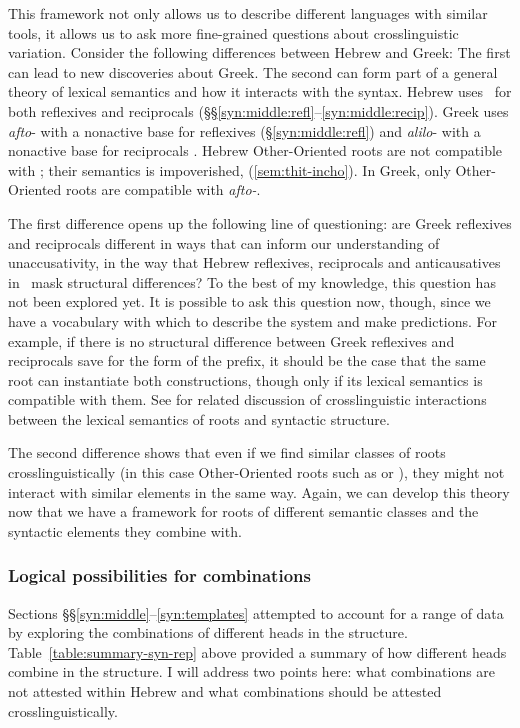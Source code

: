 This framework not only allows us to describe different languages with similar tools, it allows us to ask more fine-grained questions about crosslinguistic variation. Consider the following differences between Hebrew and Greek: The first can lead to new discoveries about Greek. The second can form part of a general theory of lexical semantics and how it interacts with the syntax.
\pex
	\a Hebrew uses \thit~for both reflexives and reciprocals (\S\S\ref{syn:middle:refl}--\ref{syn:middle:recip}). Greek uses \emph{afto}- with a nonactive base for reflexives (\S\ref{syn:middle:refl}) and \emph{alilo}- with a nonactive base for reciprocals \citep{alexiadouafto}.
	\a Hebrew Other-Oriented roots are not compatible with \va; their semantics is impoverished, (\ref{sem:thit-incho}). In Greek, only Other-Oriented roots are compatible with \emph{afto-}.
\xe

The first difference opens up the following line of questioning: are Greek reflexives and reciprocals different in ways that can inform our understanding of unaccusativity, in the way that Hebrew reflexives, reciprocals and anticausatives in \thit~mask structural differences? To the best of my knowledge, this question has not been explored yet. It is possible to ask this question now, though, since we have a vocabulary with which to describe the system and make predictions. For example, if there is no structural difference between Greek reflexives and reciprocals save for the form of the prefix, it should be the case that the same root can instantiate both constructions, though only if its lexical semantics is compatible with them. See \cite{alexiadouborerschaefer14} for related discussion of crosslinguistic interactions between the lexical semantics of roots and syntactic structure.

The second difference shows that even if we find similar classes of roots crosslinguistically (in this case Other-Oriented roots such as  or ), they might not interact with similar elements in the same way. Again, we can develop this theory now that we have a framework for roots of different semantic classes and the syntactic elements they combine with.

	\subsubsection{Logical possibilities for combinations} \label{syn:crosslx:combinatorics}
Sections \S\S\ref{syn:middle}--\ref{syn:templates} attempted to account for a range of data by exploring the combinations of different heads in the structure. Table~\ref{table:summary-syn-rep} above provided a summary of how different heads combine in the structure. I will address two points here: what combinations are not attested within Hebrew and what combinations should be attested crosslinguistically.

